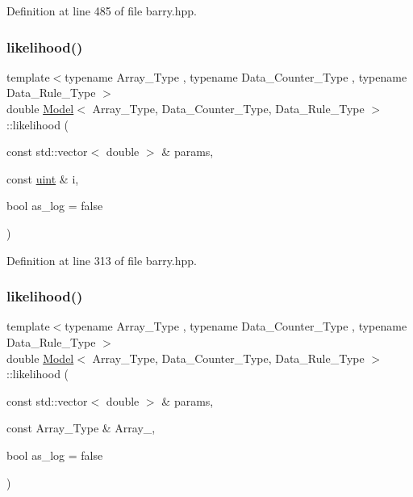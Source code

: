 Definition at line 485 of file barry.\+hpp.

\mbox{\label{classbarry_1_1_model_ae75fe2213980b6b245e279c7836ab99b}} 
\subsubsection{\texorpdfstring{likelihood()}{likelihood()}\hspace{0.1cm}{\footnotesize\ttfamily [1/3]}}
{\footnotesize\ttfamily template$<$typename Array\+\_\+\+Type , typename Data\+\_\+\+Counter\+\_\+\+Type , typename Data\+\_\+\+Rule\+\_\+\+Type $>$ \\
double \hyperlink{classbarry_1_1_model}{Model}$<$ Array\+\_\+\+Type, Data\+\_\+\+Counter\+\_\+\+Type, Data\+\_\+\+Rule\+\_\+\+Type $>$\+::likelihood (\begin{DoxyParamCaption}\item[{const std\+::vector$<$ double $>$ \&}]{params,  }\item[{const \hyperlink{namespacebarry_a11dfc53ddb4672278319aa04f1e09a6c}{uint} \&}]{i,  }\item[{bool}]{as\+\_\+log = {\ttfamily false} }\end{DoxyParamCaption})\hspace{0.3cm}{\ttfamily [inline]}}



Definition at line 313 of file barry.\+hpp.

\mbox{\label{classbarry_1_1_model_a1a11a54860e22fbd152de4d7cfd30b89}} 
\subsubsection{\texorpdfstring{likelihood()}{likelihood()}\hspace{0.1cm}{\footnotesize\ttfamily [2/3]}}
{\footnotesize\ttfamily template$<$typename Array\+\_\+\+Type , typename Data\+\_\+\+Counter\+\_\+\+Type , typename Data\+\_\+\+Rule\+\_\+\+Type $>$ \\
double \hyperlink{classbarry_1_1_model}{Model}$<$ Array\+\_\+\+Type, Data\+\_\+\+Counter\+\_\+\+Type, Data\+\_\+\+Rule\+\_\+\+Type $>$\+::likelihood (\begin{DoxyParamCaption}\item[{const std\+::vector$<$ double $>$ \&}]{params,  }\item[{const Array\+\_\+\+Type \&}]{Array\+\_\+,  }\item[{bool}]{as\+\_\+log = {\ttfamily false} }\end{DoxyParamCaption})\hspace{0.3cm}{\ttfamily [inline]}}



